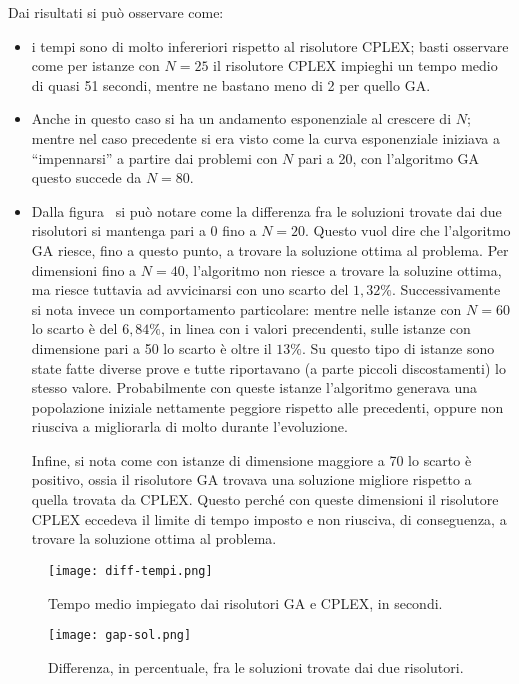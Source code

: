 Dai risultati si può osservare come:
\begin{itemize}
	\item i tempi sono di molto infereriori rispetto al risolutore CPLEX;
	basti osservare come per istanze con $N=25$ il risolutore CPLEX impieghi un tempo medio di quasi 51 secondi,
	mentre ne bastano meno di 2 per quello GA.
	\item Anche in questo caso si ha un andamento esponenziale al crescere di $N$;
	mentre nel caso precedente si era visto come la curva esponenziale iniziava a ``impennarsi'' a partire dai
	problemi con $N$ pari a 20, con l'algoritmo GA questo succede da $N=80$.
	\item Dalla figura~\label{fig:gap-sol} si può notare come la differenza fra le soluzioni trovate dai due
	risolutori si mantenga pari a 0 fino a $N=20$. Questo vuol dire che l'algoritmo GA riesce, fino a questo punto,
	a trovare la soluzione ottima al problema.
	Per dimensioni fino a $N=40$, l'algoritmo non riesce a trovare la soluzine ottima, ma riesce tuttavia
	ad avvicinarsi con uno scarto del $1,32\%$.
	Successivamente si nota invece un comportamento particolare:
	mentre nelle istanze con $N=60$ lo scarto è del $6,84\%$, in linea con i valori precendenti,
	sulle istanze con dimensione pari a 50 lo scarto è oltre il $13\%$.
	Su questo tipo di istanze sono state fatte diverse prove e tutte riportavano (a parte piccoli discostamenti)
	lo stesso valore. Probabilmente con queste istanze l'algoritmo generava una popolazione iniziale
	nettamente peggiore rispetto alle precedenti, oppure non riusciva a migliorarla di molto durante l'evoluzione.

	Infine, si nota come con istanze di dimensione maggiore a 70 lo scarto è positivo, ossia il risolutore
	GA trovava una soluzione migliore rispetto a quella trovata da CPLEX.
	Questo perché con queste dimensioni il risolutore CPLEX eccedeva il limite di tempo imposto e non riusciva,
	di conseguenza, a trovare la soluzione ottima al problema.
\end{itemize}
%
\begin{figure}[!h]
\begin{center}
	\texttt{[image: diff-tempi.png]}
{\scriptsize \caption{Tempo medio impiegato dai risolutori GA e CPLEX, in secondi.}
\label{fig:diff-tempi}}
\end{center}
\end{figure}
%
\begin{figure}[!h]
\begin{center}
	\texttt{[image: gap-sol.png]}
{\scriptsize \caption{Differenza, in percentuale, fra le soluzioni trovate dai due risolutori.}
\label{fig:gap-sol}}
\end{center}
\end{figure}
%
